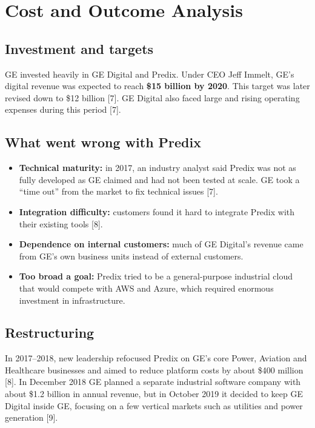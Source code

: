 \documentclass[12pt,a4paper]{article}
\begin{document}
\section{Cost and Outcome Analysis}
\subsection{Investment and targets}
GE invested heavily in GE Digital and Predix. Under CEO Jeff Immelt, GE's digital revenue was expected to reach
\textbf{\$15 billion by 2020}. This target was later revised down to \$12 billion [7]. GE Digital also faced large
and rising operating expenses during this period [7].

\subsection{What went wrong with Predix}
\begin{itemize}
  \item \textbf{Technical maturity:} in 2017, an industry analyst said Predix was not as fully developed as GE
        claimed and had not been tested at scale. GE took a ``time out'' from the market to fix technical issues [7].
  \item \textbf{Integration difficulty:} customers found it hard to integrate Predix with their existing tools [8].
  \item \textbf{Dependence on internal customers:} much of GE Digital's revenue came from GE's own business units
        instead of external customers.
  \item \textbf{Too broad a goal:} Predix tried to be a general-purpose industrial cloud that would compete with
        AWS and Azure, which required enormous investment in infrastructure.
\end{itemize}

\subsection{Restructuring}
In 2017--2018, new leadership refocused Predix on GE's core Power, Aviation and Healthcare businesses and aimed to
reduce platform costs by about \$400 million [8]. In December 2018 GE planned a separate industrial software company
with about \$1.2 billion in annual revenue, but in October 2019 it decided to keep GE Digital inside GE, focusing on a
few vertical markets such as utilities and power generation [9].
\end{document}
